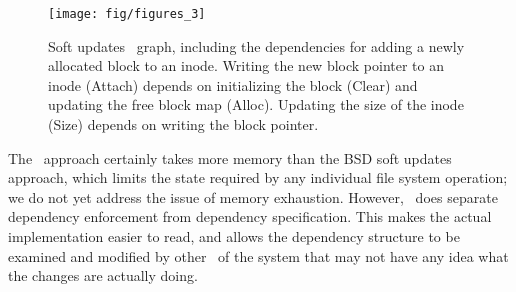 \begin{figure}[htb]
  \centering
  \texttt{[image: fig/figures\_3]}
  \caption{\label{fig:softupdate} Soft updates \chdesc\ graph,
  including the dependencies for adding a newly allocated block to an
  inode. Writing the new block pointer to an inode (Attach) depends on
  initializing the block (Clear) and updating the free block map (Alloc).
  Updating the size of the inode (Size) depends on writing the block
  pointer.}
\end{figure}


The \Kudos\ approach certainly takes more memory than the BSD soft updates approach,
which limits the state required by any individual file system operation; we do
not yet address the issue of memory exhaustion.
%
However, \Kudos\ does separate dependency enforcement from dependency
specification. This makes the actual implementation easier to read, and allows
the dependency structure to be examined and modified by other \modules\ of the
system that may not have any idea what the changes are actually doing.
